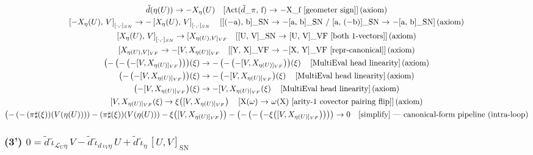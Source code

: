 \documentclass[11pt]{article}
\begin{document}
{\begin{gather*}
\tilde{d}\!\left(\eta\!\left(U\right)\right) \to -X_\eta(U) \quad \text{[Act(\ensuremath{\tilde{d}}\_\ensuremath{\pi}, f) \ensuremath{\to} \ensuremath{-}X\_f  [geometer sign]]\,(axiom)} \\
\left[-X_\eta(U),\, V\right]_{[\cdot,\cdot]_{SN}} \to -\left[X_\eta(U),\, V\right]_{[\cdot,\cdot]_{SN}} \quad \text{[[(\ensuremath{-}a), b]\_SN \ensuremath{\to} \ensuremath{-}[a, b]\_SN  /  [a, (\ensuremath{-}b)]\_SN \ensuremath{\to} \ensuremath{-}[a, b]\_SN]\,(axiom)} \\
\left[X_\eta(U),\, V\right]_{[\cdot,\cdot]_{SN}} \to [X_{\eta(U),V]_{VF}} \quad \text{[[U, V]\_SN \ensuremath{\to} [U, V]\_VF  [both 1-vectors]]\,(axiom)} \\
[X_{\eta(U),V]_{VF}} \to -[V,X_{\eta(U)]_{VF}} \quad \text{[[Y, X]\_VF \ensuremath{\to} \ensuremath{-}[X, Y]\_VF  [repr-canonical]]\,(axiom)} \\
\left(-\left(-\left(-[V,X_{\eta(U)]_{VF}}\right)\right)\right)\!\left(\xi\right) \to -\left(-\left(-[V,X_{\eta(U)]_{VF}}\right)\right)\!\left(\xi\right) \quad \text{[MultiEval head linearity]\,(axiom)} \\
\left(-\left(-[V,X_{\eta(U)]_{VF}}\right)\right)\!\left(\xi\right) \to -\left(-[V,X_{\eta(U)]_{VF}}\right)\!\left(\xi\right) \quad \text{[MultiEval head linearity]\,(axiom)} \\
\left(-[V,X_{\eta(U)]_{VF}}\right)\!\left(\xi\right) \to -[V,X_{\eta(U)]_{VF}}\!\left(\xi\right) \quad \text{[MultiEval head linearity]\,(axiom)} \\
[V,X_{\eta(U)]_{VF}}\!\left(\xi\right) \to \xi\!\left([V,X_{\eta(U)]_{VF}}\right) \quad \text{[X(\ensuremath{\omega}) \ensuremath{\to} \ensuremath{\omega}(X)  [arity-1 covector pairing flip]]\,(axiom)} \\
\left(-\left(-\left(\pi\sharp\!\left(\xi\right)\right)\!\left(V\!\left(\eta\!\left(U\right)\right)\right)\right) - \left(\pi\sharp\!\left(\xi\right)\right)\!\left(V\!\left(\eta\!\left(U\right)\right)\right) - \xi\!\left([V,X_{\eta(U)]_{VF}}\right)\right) - \left(-\left(-\left(-\xi\!\left([V,X_{\eta(U)]_{VF}}\right)\right)\right)\right) \to 0 \quad \text{[simplify]}\;\text{--- canonical-form pipeline (intra-loop)}
\end{gather*}
}

    

    \subsubsection{\texorpdfstring{(3')
\(0 = \tilde{d}\,\tilde{\iota}_{\mathcal{L}_U \eta}\,V - \tilde{d}\,\tilde{\iota}_{d\,\iota_V \eta}\,U + \tilde{d}\,\tilde{\iota}_\eta\,[U, V]_{\mathrm{SN}}\)}{(3') 0 = \textbackslash tilde\{d\}\textbackslash,\textbackslash tilde\{\textbackslash iota\}\_\{\textbackslash mathcal\{L\}\_U \textbackslash eta\}\textbackslash,V - \textbackslash tilde\{d\}\textbackslash,\textbackslash tilde\{\textbackslash iota\}\_\{d\textbackslash,\textbackslash iota\_V \textbackslash eta\}\textbackslash,U + \textbackslash tilde\{d\}\textbackslash,\textbackslash tilde\{\textbackslash iota\}\_\textbackslash eta\textbackslash,{[}U, V{]}\_\{\textbackslash mathrm\{SN\}\}}}\label{tildedtildeiota_mathcall_u-etav---tildedtildeiota_diota_v-etau-tildedtildeiota_etau-v_mathrmsn}
\end{document}
